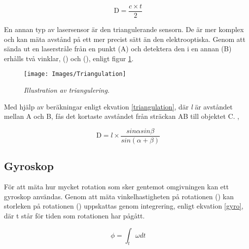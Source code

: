 \documentclass[11pt]{article}
\begin{document}
\begin{flushleft}
\begin{equation}\label{laser_eq}
\textrm{D} = \frac {c \times t}{2} 
\end{equation}

En annan typ av lasersensor är den triangulerande sensorn. De är mer komplex och kan mäta avstånd på ett mer precist sätt än den elektrooptiska. Genom att sända ut en laserstråle från en punkt (A) och detektera den i en annan (B) erhålls två vinklar, (\textalpha) och (\textbeta), enligt figur \ref{Triangulation}. 

\begin{figure}[htbp]
	\centering
	\texttt{[image: Images/Triangulation]}
	\caption{\textit{Illustration av triangulering.} \label{Triangulation}}
\end{figure}

Med hjälp av beräkningar enligt ekvation \ref{triangulation}, där \textit{l} är avståndet mellan A och B, fås det kortaste avståndet från sträckan AB till objektet C. \cite{website:mti}, \cite{website:triangulation}

\begin{equation}\label{triangulation}
\textrm{D} = l\times\frac {sin\alpha sin\beta}{sin(\alpha + \beta)} 
\end{equation}




\subsection{Gyroskop}
För att mäta hur mycket rotation som sker gentemot omgivningen kan ett gyroskop användas. Genom att mäta vinkelhastigheten på rotationen (\textomega) kan storleken på rotationen (\straightphi) uppskattas genom integrering, enligt ekvation \ref{gyro}, där t står för tiden som rotationen har pågått. \cite{Gyroscope}

\begin{equation}\label{gyro}
	\phi = \int_{t}^{ }\omega dt 						
\end{equation}



\end{flushleft}
\end{document}

